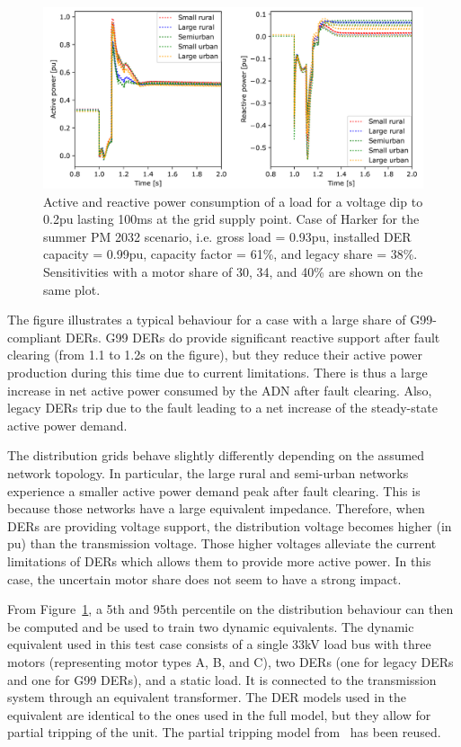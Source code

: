 \begin{figure}
    \centering
    \includegraphics[width=\linewidth]{Figs/CIGRE_equiv.png}
    \caption{Active and reactive power consumption of a load for a voltage dip to 0.2pu lasting 100ms at the grid supply point. Case of Harker for the summer PM 2032 scenario, i.e. gross load = 0.93pu, installed DER capacity = 0.99pu, capacity factor = 61\%, and legacy share = 38\%. Sensitivities with a motor share of 30, 34, and 40\% are shown on the same plot.}
    \label{fig:CIGRE_equiv}
\end{figure}

The figure illustrates a typical behaviour for a case with a large share of G99-compliant DERs. G99 DERs do provide significant reactive support after fault clearing (from 1.1 to 1.2s on the figure), but they reduce their active power production during this time due to current limitations. There is thus a large increase in net active power consumed by the ADN after fault clearing. Also, legacy DERs trip due to the fault leading to a net increase of the steady-state active power demand.

The distribution grids behave slightly differently depending on the assumed network topology. In particular, the large rural and semi-urban networks experience a smaller active power demand peak after fault clearing. This is because those networks have a large equivalent impedance. Therefore, when DERs are providing voltage support, the distribution voltage becomes higher (in pu) than the transmission voltage. Those higher voltages alleviate the current limitations of DERs which allows them to provide more active power. In this case, the uncertain motor share does not seem to have a strong impact.

From Figure~\ref{fig:CIGRE_equiv}, a 5th and 95th percentile on the distribution behaviour can then be computed and be used to train two dynamic equivalents. The dynamic equivalent used in this test case consists of a single 33kV load bus with three motors (representing motor types A, B, and C), two DERs (one for legacy DERs and one for G99 DERs), and a static load. It is connected to the transmission system through an equivalent transformer. The DER models used in the equivalent are identical to the ones used in the full model, but they allow for partial tripping of the unit. The partial tripping model from~\cite{ChaspierreThesis} has been reused.



